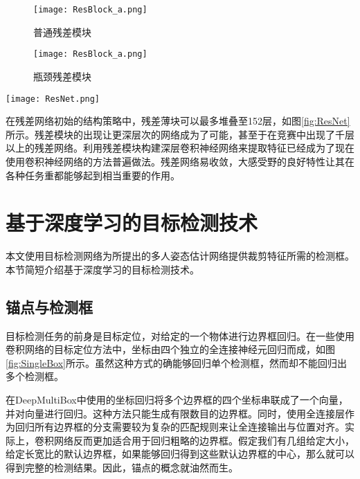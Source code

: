 \begin{figure*}[htbp]	
	\centering
	\begin{subfigure}[b]{0.25\textwidth}
		\texttt{[image: ResBlock\_a.png]}
		\caption{普通残差模块}
	\end{subfigure}
	\hskip1.5cm
	\begin{subfigure}[b]{0.25\textwidth}
		\texttt{[image: ResBlock\_a.png]}
		\caption{瓶颈残差模块}
	\end{subfigure}
	\caption{残差模块结构\cite{He2015Deep}}
	\label{fig:Resblock}
\end{figure*}
\begin{figure*}[htbp]	
	\centering
	\texttt{[image: ResNet.png]}
	\caption{残差网络结构\cite{He2015Deep}}
	\label{fig:ResNet}
\end{figure*}

在残差网络初始的结构策略中，残差薄块可以最多堆叠至152层，如图\ref{fig:ResNet}所示。残差模块的出现让更深层次的网络成为了可能，甚至于在竞赛中出现了千层以上的残差网络。利用残差模块构建深层卷积神经网络来提取特征已经成为了现在使用卷积神经网络的方法普遍做法。残差网络易收敛，大感受野的良好特性让其在各种任务重都能够起到相当重要的作用。

\section{基于深度学习的目标检测技术}
\label{sec:factsobjectdetection}
本文使用目标检测网络为所提出的多人姿态估计网络提供裁剪特征所需的检测框。本节简短介绍基于深度学习的目标检测技术。

\subsection{锚点与检测框}
\label{subsec:factsanchors}
目标检测任务的前身是目标定位，对给定的一个物体进行边界框回归\cite{ILSVRC15}。在一些使用卷积网络的目标定位方法中，坐标由四个独立的全连接神经元回归而成，如图\ref{fig:SingleBox}所示。虽然这种方式的确能够回归单个检测框，然而却不能回归出多个检测框。

在DeepMultiBox中使用的坐标回归\cite{erhan2014scalable}将多个边界框的四个坐标串联成了一个向量，并对向量进行回归。这种方法只能生成有限数目的边界框。同时，使用全连接层作为回归所有边界框的分支需要较为复杂的匹配规则来让全连接输出与位置对齐。实际上，卷积网络反而更加适合用于回归粗略的边界框。假定我们有几组给定大小，给定长宽比的默认边界框，如果能够回归得到这些默认边界框的中心，那么就可以得到完整的检测结果。因此，锚点的概念就油然而生。

